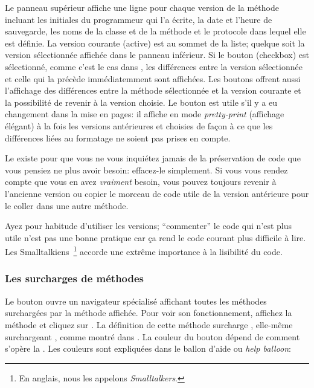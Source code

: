 \documentclass[a4paper,10pt,twoside]{book}
\begin{document}
Le panneau sup\'erieur affiche une ligne pour chaque version de la m\'ethode
incluant les initiales du programmeur qui l'a \'ecrite, la date et l'heure de
sauvegarde, les noms de la classe et de la m\'ethode et le protocole dans 
lequel elle est d\'efinie.
La version courante (active) est au sommet de la liste; quelque soit la version
s\'electionn\'ee affich\'ee dans le panneau inf\'erieur.
Si le bouton (checkbox)  est s\'electionn\'e, 
comme c'est le cas dans , 
les diff\'erences entre la version s\'electionn\'ee et celle qui la pr\'ec\`ede
imm\'ediatemment sont affich\'ees.
Les boutons offrent aussi l'affichage des diff\'erences entre la m\'ethode s\'electionn\'ee et la version courante et la possibilit\'e de revenir \`a la version choisie.  
Le bouton  est utile s'il y a eu changement dans la mise en
pages: il affiche en mode \emph{pretty-print} (affichage \'el\'egant) 
\`a la fois les versions ant\'erieures et choisies de fa\c{c}on \`a
ce que les diff\'erences li\'ees au formatage ne soient pas prises en compte.

Le  existe pour que vous ne vous inqui\'etez jamais
de la pr\'eservation de code que vous pensiez ne plus avoir besoin: effacez-le simplement. Si vous vous rendez compte que vous en avez \emph{vraiment} besoin, 
vous pouvez toujours revenir \`a l'ancienne version ou copier le morceau de 
code utile de la version ant\'erieure pour le coller dans une autre m\'ethode.

Ayez pour habitude d'utiliser les versions; ``commenter'' le code qui n'est plus utile n'est pas une bonne pratique car \c{c}a rend le code courant plus
difficile \`a lire. Les Smalltalkiens~\footnote{En anglais, nous les appelons
 \emph{Smalltalkers}.} accorde une extr\^eme importance \`a la lisibilit\'e du code.


\subsubsection{Les surcharges de m\'ethodes}
\label{sec:overriding}

Le bouton  ouvre un navigateur sp\'ecialis\'e affichant
toutes les m\'ethodes surcharg\'ees par la m\'ethode affich\'ee.
Pour voir son fonctionnement, affichez la m\'ethode
 et cliquez sur .
La d\'efinition de cette m\'ethode surcharge 
\mbox{,} elle-m\^eme surchargeant
, comme montr\'e dans .
La couleur du bouton  d\'epend 
de comment s'op\`ere la . 
Les couleurs sont expliqu\'ees dans le ballon d'aide ou \emph{help balloon}:
\end{document}
